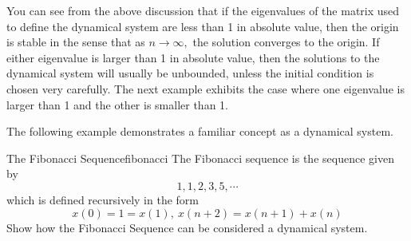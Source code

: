 You can see from the above discussion that if the eigenvalues of the matrix
used to define the dynamical system are less than 1 in absolute value, then
the origin is stable in the sense that as $n\rightarrow \infty ,$ the
solution converges to the origin. If either eigenvalue is larger than 1 in
absolute value, then the solutions to the dynamical system will usually be
unbounded, unless the initial condition is chosen very carefully. The next
example exhibits the case where one eigenvalue is larger than 1 and the
other is smaller than 1.

The following example demonstrates a familiar concept as a dynamical system.

\begin{example}{The Fibonacci Sequence}{fibonacci}
The Fibonacci sequence is the sequence given by 
\begin{equation*}
1, 1, 2, 3, 5, \cdots
\end{equation*}
which is defined recursively in the
form
\begin{equation*}
x\left( 0\right) =1=x\left( 1\right) ,\ x\left( n+2\right) =x\left(
n+1\right) +x\left( n\right)
\end{equation*}
Show how the Fibonacci Sequence can be considered a dynamical system.
\end{example}

